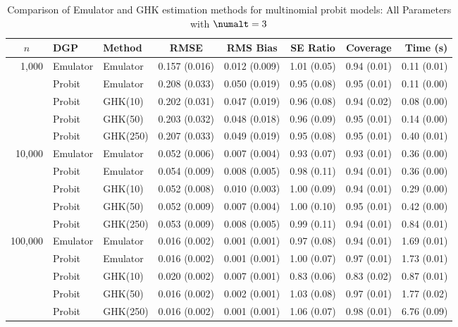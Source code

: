 \begin{table}[htbp]
\centering
\footnotesize
\begin{tabular}{@{}rllrrrrr@{}}
\toprule
\multicolumn{1}{c}{$n$} & \multicolumn{1}{l}{DGP} & \multicolumn{1}{l}{Method} & \multicolumn{1}{c}{RMSE} & \multicolumn{1}{c}{RMS Bias} & \multicolumn{1}{c}{SE Ratio} & \multicolumn{1}{c}{Coverage} & \multicolumn{1}{r}{Time (s)} \\
\midrule
\multirow{5}{*}{1,000} & Emulator & Emulator & 0.157 (0.016) & 0.012 (0.009) & 1.01 (0.05) & 0.94 (0.01) & 0.11 (0.01) \\
 & Probit & Emulator & 0.208 (0.033) & 0.050 (0.019) & 0.95 (0.08) & 0.95 (0.01) & 0.11 (0.00) \\
 & Probit & GHK(10) & 0.202 (0.031) & 0.047 (0.019) & 0.96 (0.08) & 0.94 (0.02) & 0.08 (0.00) \\
 & Probit & GHK(50) & 0.203 (0.032) & 0.048 (0.018) & 0.96 (0.09) & 0.95 (0.01) & 0.14 (0.00) \\
 & Probit & GHK(250) & 0.207 (0.033) & 0.049 (0.019) & 0.95 (0.08) & 0.95 (0.01) & 0.40 (0.01) \\
\midrule
\multirow{5}{*}{10,000} & Emulator & Emulator & 0.052 (0.006) & 0.007 (0.004) & 0.93 (0.07) & 0.93 (0.01) & 0.36 (0.00) \\
 & Probit & Emulator & 0.054 (0.009) & 0.008 (0.005) & 0.98 (0.11) & 0.94 (0.01) & 0.36 (0.00) \\
 & Probit & GHK(10) & 0.052 (0.008) & 0.010 (0.003) & 1.00 (0.09) & 0.94 (0.01) & 0.29 (0.00) \\
 & Probit & GHK(50) & 0.052 (0.009) & 0.007 (0.004) & 1.00 (0.10) & 0.95 (0.01) & 0.42 (0.00) \\
 & Probit & GHK(250) & 0.053 (0.009) & 0.008 (0.005) & 0.99 (0.11) & 0.94 (0.01) & 0.84 (0.01) \\
\midrule
\multirow{5}{*}{100,000} & Emulator & Emulator & 0.016 (0.002) & 0.001 (0.001) & 0.97 (0.08) & 0.94 (0.01) & 1.69 (0.01) \\
 & Probit & Emulator & 0.016 (0.002) & 0.001 (0.001) & 1.00 (0.07) & 0.97 (0.01) & 1.73 (0.01) \\
 & Probit & GHK(10) & 0.020 (0.002) & 0.007 (0.001) & 0.83 (0.06) & 0.83 (0.02) & 0.87 (0.01) \\
 & Probit & GHK(50) & 0.016 (0.002) & 0.002 (0.001) & 1.03 (0.08) & 0.97 (0.01) & 1.77 (0.02) \\
 & Probit & GHK(250) & 0.016 (0.002) & 0.001 (0.001) & 1.06 (0.07) & 0.98 (0.01) & 6.76 (0.09) \\
\bottomrule
\end{tabular}
\caption{Comparison of Emulator and GHK estimation methods for multinomial probit models: All Parameters with $\numalt=3$}
\label{tab:emulator_vs_ghk:3:all}
\end{table}